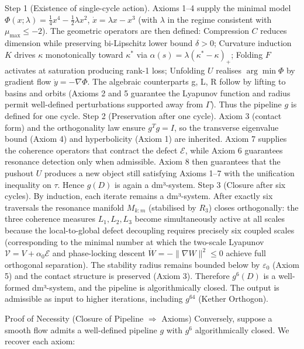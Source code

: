 Step 1 (Existence of single-cycle action). Axioms 1–4 supply the minimal model $  \Phi(x;\lambda) = \frac14 x^4 - \frac12 \lambda x^2  $, $  \dot{x} = \lambda x - x^3  $ (with $  \lambda  $ in the regime consistent with $  \mu_{\max} \le -2  $). The geometric operators are then defined: Compression $  C  $ reduces dimension while preserving bi-Lipschitz lower bound $  \delta > 0  $; Curvature induction $  K  $ drives $  \kappa  $ monotonically toward $  \kappa^*  $ via $  \alpha(s) = \lambda(\kappa^* - \kappa)_+  $; Folding $  F  $ activates at saturation producing rank-1 loss; Unfolding $  U  $ realises $  \arg\min \Phi  $ by gradient flow $  \dot{y} = -\nabla\Phi  $. The algebraic counterparts g, L, R follow by lifting to basins and orbits (Axioms 2 and 5 guarantee the Lyapunov function and radius permit well-defined perturbations supported away from $  \Gamma  $). Thus the pipeline $  g  $ is defined for one cycle.
Step 2 (Preservation after one cycle). Axiom 3 (contact form) and the orthogonality law ensure $  g^T g = I  $, so the transverse eigenvalue bound (Axiom 4) and hyperbolicity (Axiom 1) are inherited. Axiom 7 supplies the coherence operators that contract the defect $  \mathcal{E}  $, while Axiom 6 guarantees resonance detection only when admissible. Axiom 8 then guarantees that the pushout $  U  $ produces a new object still satisfying Axioms 1–7 with the unification inequality on $  \tau  $. Hence $  g(D)  $ is again a dm³-system.
Step 3 (Closure after six cycles). By induction, each iterate remains a dm³-system. After exactly six traversals the resonance manifold $  M_{k:m}  $ (stabilised by $  R_3  $) closes orthogonally: the three coherence measures $  L_1, L_2, L_3  $ become simultaneously active at all scales because the local-to-global defect decoupling requires precisely six coupled scales (corresponding to the minimal number at which the two-scale Lyapunov $  \mathcal{V} = V + \alpha_0 \mathcal{E}  $ and phase-locking descent $  \dot{W} = -\|\nabla W\|^2 \le 0  $ achieve full orthogonal separation). The stability radius remains bounded below by $  \varepsilon_0  $ (Axiom 5) and the contact structure is preserved (Axiom 3). Therefore $  g^6(D)  $ is a well-formed dm³-system, and the pipeline is algorithmically closed. The output is admissible as input to higher iterations, including $  g^{64}  $ (Kether Orthogon).

Proof of Necessity (Closure of Pipeline $  \Rightarrow  $ Axioms)
Conversely, suppose a smooth flow admits a well-defined pipeline $  g  $ with $  g^6  $ algorithmically closed. We recover each axiom:

